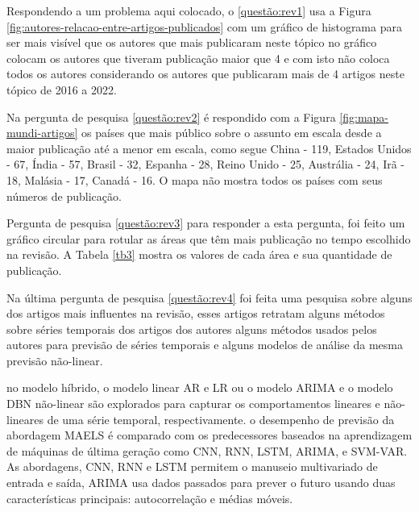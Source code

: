 



 Respondendo a um problema aqui colocado, o \ref{questão:rev1} usa a Figura \ref{fig:autores-relacao-entre-artigos-publicados} com um gráfico de histograma para ser mais visível que os autores que mais publicaram neste tópico no gráfico colocam os autores que tiveram publicação maior que 4 e com isto não coloca todos os autores considerando os autores que publicaram mais de 4 artigos neste tópico de 2016 a 2022.




Na pergunta de pesquisa \ref{questão:rev2} é respondido com a Figura \ref{fig:mapa-mundi-artigos} os países que mais público sobre o assunto em escala desde a maior publicação até a menor em escala, como segue China - 119, Estados Unidos - 67, Índia - 57, Brasil - 32, Espanha - 28, Reino Unido - 25, Austrália - 24, Irã - 18, Malásia - 17, Canadá - 16. O mapa não mostra todos os países com seus números de publicação.




Pergunta de pesquisa \ref{questão:rev3} para responder a esta pergunta, foi feito um gráfico circular para rotular as áreas que têm mais publicação no tempo escolhido na revisão. A Tabela \ref{tb3} mostra os valores de cada área e sua quantidade de publicação. 


	

Na última pergunta de pesquisa \ref{questão:rev4} foi feita uma pesquisa sobre alguns dos artigos mais influentes na revisão, esses artigos retratam alguns métodos sobre séries temporais dos artigos dos autores 
 alguns métodos usados pelos autores para previsão de séries temporais e alguns modelos de análise da mesma previsão não-linear. 

 
 no modelo híbrido, o modelo linear AR e LR ou o modelo ARIMA e o modelo DBN não-linear são explorados para capturar os comportamentos lineares e não-lineares de uma série temporal, respectivamente.  o desempenho de previsão da abordagem MAELS é comparado com os predecessores baseados na aprendizagem de máquinas de última geração como CNN, RNN, LSTM, ARIMA, e SVM-VAR. As abordagens, CNN, RNN e LSTM permitem o manuseio multivariado de entrada e saída, ARIMA usa dados passados para prever o futuro usando duas características principais: autocorrelação e médias móveis.

